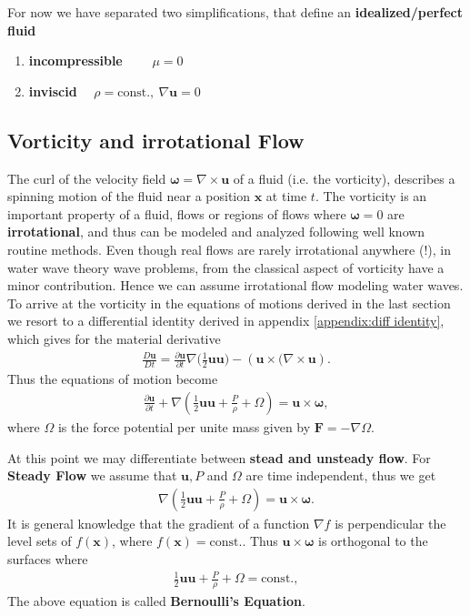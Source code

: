 For now we have separated two simplifications, that define an
\textbf{idealized/perfect fluid}
\begin{enumerate}
    \item \textbf{incompressible} $\qquad \mu=0$
    \item  \textbf{inviscid} $\quad \rho = \text{const.},\ \nabla \mathbf{u}=
        0$
\end{enumerate}
\subsection{Vorticity and irrotational Flow}
The curl of the velocity field $\mathbf{\omega} = \nabla \times \mathbf{u}$
of a fluid (i.e. the vorticity), describes a spinning motion of the fluid
near a position $\mathbf{x}$ at time $t$. The vorticity is an important
property of a fluid, flows or regions of flows where $\mathbf{\omega}=0$ are
\textbf{irrotational}, and thus can be modeled and analyzed following well
known routine methods. Even though real flows are rarely irrotational
anywhere (!), in water wave theory wave problems, from the classical aspect
of vorticity have a minor contribution. Hence we can assume irrotational flow
modeling water waves. To arrive at the vorticity in the equations of motions
derived in the last section we resort to a differential identity derived in appendix
\ref{appendix:diff identity}, which gives for the material derivative
\begin{align}
    \frac{D\mathbf{u}}{Dt} = \frac{\partial \mathbf{u}}{\partial t}
    \nabla(\frac{1}{2}\mathbf{u}\mathbf{u)}
    - \left( \mathbf{u}\times (\nabla \times  \mathbf{u} \right).
\end{align}
Thus the equations of motion become
\begin{align}
    \frac{\partial \mathbf{u}}{\partial t} + \nabla\left(
    \frac{1}{2}\mathbf{u}\mathbf{u} + \frac{P}{\rho} + \Omega \right)
    = \mathbf{u} \times  \mathbf{\omega},
\end{align}
where $\Omega$ is the force potential per
unite mass given by $\mathbf{F} = -\nabla \Omega$.

At this point we may differentiate between \textbf{stead and unsteady flow}.
For \textbf{Steady Flow} we assume that $\mathbf{u}, P$ and $\Omega$ are time
independent, thus we get
\begin{align}
      \nabla\left( \frac{1}{2}\mathbf{u}\mathbf{u} + \frac{P}{\rho} + \Omega
      \right)  = \mathbf{u} \times  \mathbf{\omega}.
\end{align}
It is general knowledge that the gradient of a function $\nabla f$ is
perpendicular the level sets of $f(\mathbf{x})$, where $f(\mathbf{x}) =
\text{const.}$. Thus $\mathbf{u} \times  \mathbf{\omega}$ is orthogonal to
the surfaces  where
\begin{align} \label{eq:bernoulli}
    \frac{1}{2}\mathbf{u}\mathbf{u} + \frac{P}{\rho} + \Omega =
    \text{const.},
\end{align}
The above equation is called \textbf{Bernoulli's Equation}.

